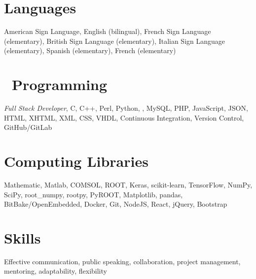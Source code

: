 \documentclass[margin,line]{resume}
\let\origsection\section%
\let\section\subsection%
\let\section\origsection%
\begin{document}
\begin{resume}
\section{\mysidestyle Languages}

American Sign Language, English (bilingual), French Sign Language (elementary), British Sign Language (elementary), Italian Sign Language (elementary), Spanish (elementary), French (elementary)

\section{\mysidestyle {}~Programming}

\textsl{Full Stack Developer}, C, C++, Perl, Python, \LaTeXe, MySQL, PHP, JavaScript, JSON, HTML, XHTML, XML, CSS, VHDL, Continuous Integration, Version Control, GitHub/GitLab

\section{\mysidestyle Computing Libraries}

Mathematic, Matlab, COMSOL, ROOT, Keras, scikit-learn, TensorFlow, NumPy, SciPy, root\_numpy, rootpy, PyROOT, Matplotlib, pandas, BitBake/OpenEmbedded, Docker, Git, NodeJS, React, jQuery, Bootstrap

\section{\mysidestyle Skills}

Effective communication, public speaking, collaboration, project management, mentoring, adaptability, flexibility

%
%
\end{resume}
\end{document}
